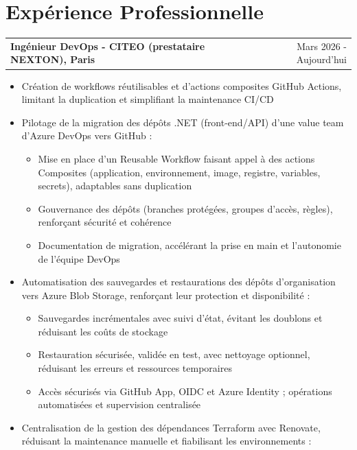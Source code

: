 \documentclass[a4paper,10pt]{article}
\makeatletter
\newenvironment{joblong}[2]
    {
    \begin{tabularx}{\linewidth}{@{}l X r@{}}
    \textbf{#1} & \hfill &  #2 \\[2pt]
    \end{tabularx}
    \begin{minipage}[t]{\linewidth}
    \begin{itemize}[after=\strut, leftmargin=1em, itemsep=3pt,label=--]
    }
    {
    \end{itemize}
    \end{minipage}    
    }
\makeatother
\begin{document}
\vspace{3pt}


\section{Expérience Professionnelle}

\begin{joblong}{Ingénieur DevOps - CITEO (prestataire NEXTON), Paris}{Mars 2026 - Aujourd'hui}
\item Création de workflows réutilisables et d'actions composites GitHub Actions, limitant la duplication et simplifiant la maintenance CI/CD
\item Pilotage de la migration des dépôts .NET (front-end/API) d'une value team d'Azure DevOps vers GitHub :
\begin{itemize}[nosep, leftmargin=1em, itemsep=0pt, label=\textbullet]
\item Mise en place d'un Reusable Workflow faisant appel à des actions Composites (application, environnement, image, registre, variables, secrets), adaptables sans duplication
\item Gouvernance des dépôts (branches protégées, groupes d'accès, règles), renforçant sécurité et cohérence
\item Documentation de migration, accélérant la prise en main et l'autonomie de l'équipe DevOps
\end{itemize}
\item Automatisation des sauvegardes et restaurations des dépôts d'organisation vers Azure Blob Storage, renforçant leur protection et disponibilité :
\begin{itemize}[nosep, leftmargin=1em, itemsep=0pt, label=\textbullet]
\item Sauvegardes incrémentales avec suivi d'état, évitant les doublons et réduisant les coûts de stockage
\item Restauration sécurisée, validée en test, avec nettoyage optionnel, réduisant les erreurs et ressources temporaires
\item Accès sécurisés via GitHub App, OIDC et Azure Identity ; opérations automatisées et supervision centralisée
\end{itemize}
\item Centralisation de la gestion des dépendances Terraform avec Renovate, réduisant la maintenance manuelle et fiabilisant les environnements :

\end{joblong}
\end{document}

